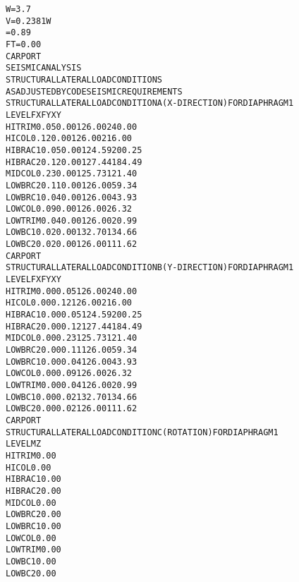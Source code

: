 \documentclass[12pt,notitle,letterpaper]{report}
\renewenvironment{quote}
  {\small\list{}{\rightmargin=0cm \leftmargin=0cm}%
   \item\relax}
  {\endlist}
\begin{document}
\begin{quote}
\begin{alltt}
W =       3.7
V =    0.2381W
   =      0.89
FT=      0.00
CARPORT
SEISMIC ANALYSIS
STRUCTURAL LATERAL LOAD CONDITIONS
AS ADJUSTED BY CODE SEISMIC REQUIREMENTS
STRUCTURAL LATERAL LOAD CONDITION A (X-DIRECTION) FOR DIAPHRAGM     1
LEVEL             FX          FY           X           Y
HITRIM          0.05        0.00      126.00      240.00
HICOL           0.12        0.00      126.00      216.00
HIBRAC1         0.05        0.00      124.59      200.25
HIBRAC2         0.12        0.00      127.44      184.49
MIDCOL          0.23        0.00      125.73      121.40
LOWBRC2         0.11        0.00      126.00       59.34
LOWBRC1         0.04        0.00      126.00       43.93
LOWCOL          0.09        0.00      126.00       26.32
LOWTRIM         0.04        0.00      126.00       20.99
LOWBC1          0.02        0.00      132.70      134.66
LOWBC2          0.02        0.00      126.00      111.62
CARPORT
STRUCTURAL LATERAL LOAD CONDITION B (Y-DIRECTION) FOR DIAPHRAGM     1
LEVEL             FX          FY           X           Y
HITRIM          0.00        0.05      126.00      240.00
HICOL           0.00        0.12      126.00      216.00
HIBRAC1         0.00        0.05      124.59      200.25
HIBRAC2         0.00        0.12      127.44      184.49
MIDCOL          0.00        0.23      125.73      121.40
LOWBRC2         0.00        0.11      126.00       59.34
LOWBRC1         0.00        0.04      126.00       43.93
LOWCOL          0.00        0.09      126.00       26.32
LOWTRIM         0.00        0.04      126.00       20.99
LOWBC1          0.00        0.02      132.70      134.66
LOWBC2          0.00        0.02      126.00      111.62
CARPORT
STRUCTURAL LATERAL LOAD CONDITION C (ROTATION) FOR DIAPHRAGM     1
LEVEL             MZ
HITRIM          0.00
HICOL           0.00
HIBRAC1         0.00
HIBRAC2         0.00
MIDCOL          0.00
LOWBRC2         0.00
LOWBRC1         0.00
LOWCOL          0.00
LOWTRIM         0.00
LOWBC1          0.00
LOWBC2          0.00
\end{alltt}
\end{quote}
\end{document}
